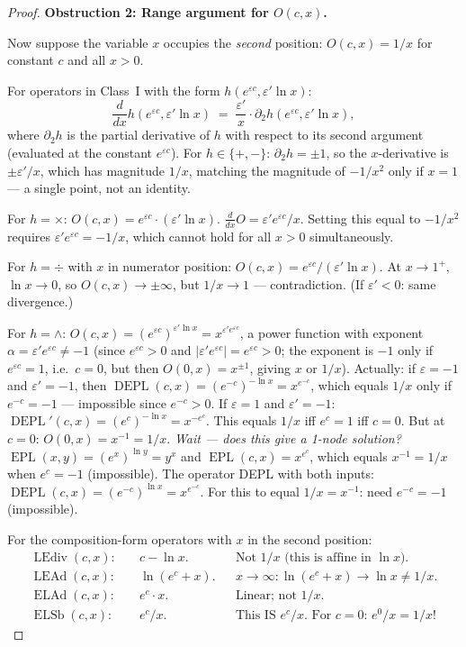 \documentclass[12pt,a4paper]{article}
\theoremstyle{definition}
\newcommand{\DEPL}{\operatorname{DEPL}}
\newcommand{\EPL}{\operatorname{EPL}}
\newcommand{\ELAd}{\operatorname{ELAd}}
\newcommand{\ELSb}{\operatorname{ELSb}}
\newcommand{\LEAd}{\operatorname{LEAd}}
\newcommand{\LEdiv}{\operatorname{LEdiv}}
\begin{document}
\begin{proof}
\noindent\textbf{Obstruction 2: Range argument for $O(c, x)$.}

Now suppose the variable $x$ occupies the \emph{second} position:
$O(c, x) = 1/x$ for constant $c$ and all $x>0$.

For operators in Class~I with the form $h(e^{\varepsilon c}, \varepsilon'\ln x)$:
\[
  \frac{d}{dx}h(e^{\varepsilon c}, \varepsilon'\ln x)
  \;=\; \frac{\varepsilon'}{x}\cdot \partial_2 h(e^{\varepsilon c}, \varepsilon'\ln x),
\]
where $\partial_2 h$ is the partial derivative of $h$ with respect to its
second argument (evaluated at the constant $e^{\varepsilon c}$).
For $h \in\{+,-\}$: $\partial_2 h = \pm 1$, so the $x$-derivative is $\pm\varepsilon'/x$,
which has magnitude $1/x$, matching the magnitude of $-1/x^2$ only if $x=1$ --- a
single point, not an identity.

For $h=\times$: $O(c,x) = e^{\varepsilon c}\cdot(\varepsilon'\ln x)$.
$\frac{d}{dx}O = \varepsilon'e^{\varepsilon c}/x$.
Setting this equal to $-1/x^2$ requires $\varepsilon'e^{\varepsilon c} = -1/x$,
which cannot hold for all $x>0$ simultaneously.

For $h=\div$ with $x$ in numerator position: $O(c,x) = e^{\varepsilon c}/(\varepsilon'\ln x)$.
At $x\to 1^+$, $\ln x\to 0$, so $O(c,x)\to\pm\infty$, but $1/x\to 1$ --- contradiction.
(If $\varepsilon'<0$: same divergence.)

For $h=\wedge$: $O(c,x) = (e^{\varepsilon c})^{\varepsilon'\ln x} = x^{\varepsilon'e^{\varepsilon c}}$,
a power function with exponent $\alpha = \varepsilon'e^{\varepsilon c} \neq -1$
(since $e^{\varepsilon c} > 0$ and $|\varepsilon'e^{\varepsilon c}|=e^{\varepsilon c}>0$;
the exponent is $-1$ only if $e^{\varepsilon c}=1$, i.e.\ $c=0$, but then
$O(0,x)=x^{\pm 1}$, giving $x$ or $1/x$).
Actually: if $\varepsilon=-1$ and $\varepsilon'=-1$, then
$\DEPL(c,x) = (e^{-c})^{-\ln x} = x^{e^{-c}}$, which equals $1/x$ only if
$e^{-c}=-1$ --- impossible since $e^{-c}>0$.
If $\varepsilon=1$ and $\varepsilon'=-1$: $\DEPL'(c,x)=(e^c)^{-\ln x}=x^{-e^c}$.
This equals $1/x$ iff $e^c=1$ iff $c=0$.
But at $c=0$: $O(0,x) = x^{-1} = 1/x$.
\textit{Wait — does this give a 1-node solution?}
$\EPL(x,y) = (e^x)^{\ln y} = y^x$ and $\EPL(c,x) = x^{e^c}$, which equals
$x^{-1}=1/x$ when $e^c=-1$ (impossible).
The operator DEPL with both inputs: $\DEPL(c,x) = (e^{-c})^{\ln x} = x^{e^{-c}}$.
For this to equal $1/x = x^{-1}$: need $e^{-c}=-1$ (impossible).

For the composition-form operators with $x$ in the second position:
\begin{align*}
  \LEdiv(c,x): & \quad c - \ln x. && \text{Not $1/x$ (this is affine in $\ln x$).}\\
  \LEAd(c,x): & \quad \ln(e^c + x). && x\to\infty: \ln(e^c+x)\to\ln x\neq 1/x.\\
  \ELAd(c,x): & \quad e^c\cdot x. && \text{Linear; not $1/x$.}\\
  \ELSb(c,x): & \quad e^c/x. && \text{This IS $e^c/x$. For $c=0$: $e^0/x = 1/x$!}
\end{align*}


\end{proof}
\end{document}

